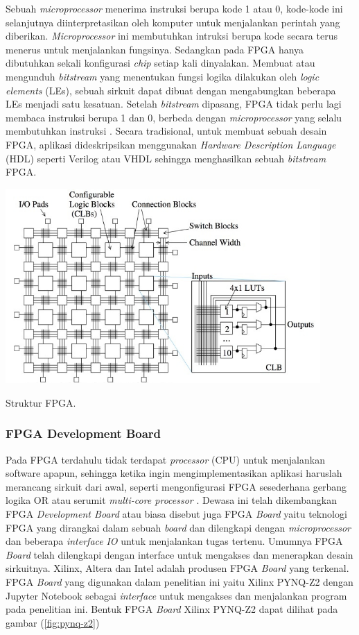 Sebuah \textit{microprocessor} menerima instruksi berupa kode 1 atau 0, kode-kode ini selanjutnya diinterpretasikan oleh komputer untuk menjalankan perintah yang diberikan. \textit{Microprocessor} ini membutuhkan intruksi berupa kode secara terus menerus untuk menjalankan fungsinya. Sedangkan pada FPGA hanya dibutuhkan sekali konfigurasi \textit{chip} setiap kali dinyalakan. Membuat atau mengunduh \textit{bitstream} yang menentukan fungsi logika dilakukan oleh \textit{logic elements} (LEs), sebuah sirkuit dapat dibuat dengan mengabungkan beberapa LEs menjadi satu kesatuan. Setelah \textit{bitstream} dipasang, FPGA tidak perlu lagi membaca instruksi berupa 1 dan 0, berbeda dengan \textit{microprocessor} yang selalu membutuhkan instruksi \cite{pdf:cheung}. Secara tradisional, untuk membuat sebuah desain FPGA, aplikasi dideskripsikan menggunakan \textit{Hardware Description Language} (HDL) seperti Verilog atau VHDL sehingga menghasilkan sebuah \textit{bitstream} FPGA. 

\begin{afigure}
    \includegraphics[width=12cm, center]{images/fpga-structure.jpeg}
    \caption{Struktur FPGA.}
    \label{fig:fpga-structure}
\end{afigure}

\subsubsection{FPGA Development Board}
Pada FPGA terdahulu tidak terdapat \textit{processor} (CPU) untuk menjalankan software apapun, sehingga ketika ingin mengimplementasikan aplikasi haruslah merancang sirkuit dari awal, seperti mengonfigurasi FPGA sesederhana gerbang logika OR atau serumit \textit{multi-core processor} \cite{site:biswas}. Dewasa ini telah dikembangkan FPGA \textit{Development Board} atau biasa disebut juga FPGA \textit{Board} yaitu teknologi FPGA yang dirangkai dalam sebuah \textit{board} dan dilengkapi dengan \textit{microprocessor} dan beberapa \textit{interface} \textit{IO} untuk menjalankan tugas tertenu. Umumnya FPGA \textit{Board} telah dilengkapi dengan interface untuk mengakses dan menerapkan desain sirkuitnya. Xilinx, Altera dan Intel adalah produsen FPGA \textit{Board} yang terkenal. FPGA \textit{Board} yang digunakan dalam penelitian ini yaitu Xilinx PYNQ-Z2 dengan Jupyter Notebook sebagai \textit{interface} untuk mengakses dan menjalankan program pada penelitian ini. Bentuk FPGA \textit{Board} Xilinx PYNQ-Z2 dapat dilihat pada gambar (\ref{fig:pynq-z2})

